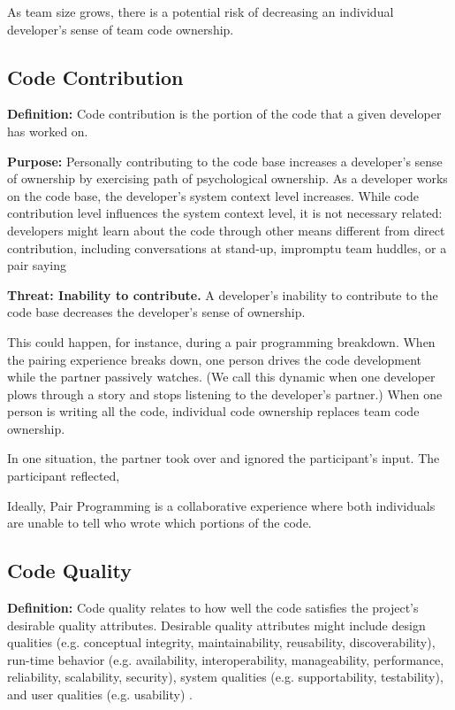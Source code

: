 As team size grows, there is a potential risk of decreasing an individual developer's sense of team code ownership. 

\subsection{Code Contribution}
\textbf{Definition:} Code contribution is the portion of the code that a given developer has worked on. 

\textbf{Purpose:} Personally contributing to the code base increases a developer's sense of ownership by exercising  path of psychological ownership. As a developer works on the code base, the developer's system context level increases. While code contribution level influences the system context level, it is not necessary related: developers might learn about the code through other means different from direct contribution, including conversations at stand-up, impromptu team huddles, or a pair saying 

\textbf{Threat: Inability to contribute.}  A developer's inability to contribute to the code base decreases the developer's sense of ownership. 

This could happen, for instance, during a pair programming breakdown. When the pairing experience breaks down, one person drives the code development while the partner passively watches. (We call this dynamic  when one developer plows through a story and stops listening to the developer's partner.)  When one person is writing all the code, individual code ownership replaces team code ownership.  

In one situation, the partner took over and ignored the participant's input. The participant reflected,  

Ideally, Pair Programming is a collaborative experience where both individuals are unable to tell who wrote which portions of the code. 

\subsection{Code Quality}
\textbf{Definition:} Code quality relates to how well the code satisfies the project's desirable quality attributes. Desirable quality attributes might include design qualities (e.g. conceptual integrity, maintainability, reusability, discoverability), run-time behavior (e.g. availability, interoperability, manageability, performance, reliability, scalability, security), system qualities (e.g. supportability, testability), and user qualities (e.g. usability) \cite{Meier2009}. 

